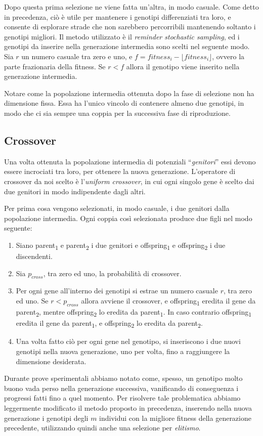 \documentclass[a4paper,12pt]{article}
\begin{document}
Dopo questa prima selezione ne viene fatta un'altra, in modo casuale. Come detto in precedenza, ciò è utile per mantenere i genotipi differenziati tra loro, e consente di esplorare strade che non sarebbero percorribili mantenendo soltanto i genotipi migliori. Il metodo utilizzato è il \emph{reminder stochastic sampling}, ed i genotipi da inserire nella generazione intermedia sono scelti nel seguente modo. Sia $r$ un numero casuale tra zero e uno, e $f = fitness_i - \lfloor fitness_i \rfloor$, ovvero la parte frazionaria della fitness. Se $r < f$ allora il genotipo viene inserito nella generazione intermedia.

Notare come la popolazione intermedia ottenuta dopo la fase di selezione non ha dimensione fissa. Essa ha l'unico vincolo di contenere almeno due genotipi, in modo che ci sia sempre una coppia per la successiva fase di riproduzione.
\subsection{Crossover} \label{crossover}
Una volta ottenuta la popolazione intermedia di potenziali ``\emph{genitori}'' essi devono essere incrociati tra loro, per ottenere la nuova generazione. L'operatore di crossover da noi scelto è l'\emph{uniform crossover}, in cui ogni singolo gene è scelto dai due genitori in modo indipendente dagli altri. 

Per prima cosa vengono selezionati, in modo casuale, i due genitori dalla popolazione intermedia. Ogni coppia così selezionata produce due figli nel modo seguente: 
\begin{enumerate}
	\item Siano parent\textsubscript{1} e parent\textsubscript{2} i due genitori e offspring\textsubscript{1} e offspring\textsubscript{2} i due discendenti.
	\item Sia $p_{cross}$, tra zero ed uno, la probabilità di crossover.
	\item Per ogni gene all'interno dei genotipi si estrae un numero casuale $r$, tra zero ed uno. Se $r < p_{cross}$ allora avviene il crossover, e offspring\textsubscript{1} eredita il gene da parent\textsubscript{2}, mentre offspring\textsubscript{2} lo eredita da parent\textsubscript{1}. In caso contrario offspring\textsubscript{1} eredita il gene da parent\textsubscript{1}, e offspring\textsubscript{2} lo eredita da parent\textsubscript{2}.
	\item Una volta fatto ciò per ogni gene nel genotipo, si inseriscono i due nuovi genotipi nella nuova generazione, uno per volta, fino a raggiungere la dimensione desiderata. 
\end{enumerate}
Durante prove sperimentali abbiamo notato come, spesso, un genotipo molto buono vada perso nella generazione successiva, vanificando di conseguenza i progressi fatti fino a quel momento. Per risolvere tale problematica abbiamo leggermente modificato il metodo proposto in precedenza, inserendo nella nuova generazione i genotipi degli $m$ individui con la migliore fitness della generazione precedente, utilizzando quindi anche una selezione per \emph{elitismo}.
\end{document}
